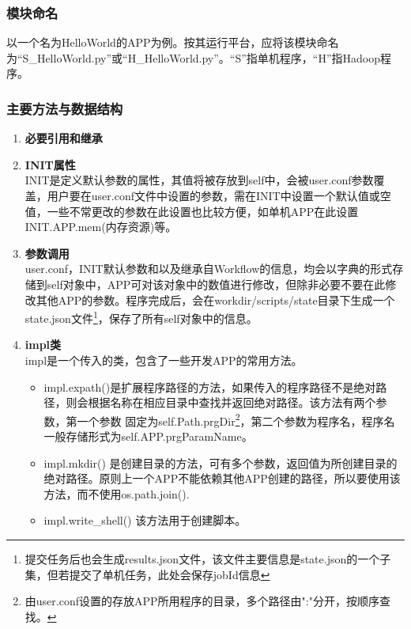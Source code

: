 \documentclass[UTF8,10pt,a4paper]{ctexart}
\begin{document}
 \subsubsection{模块命名}
以一个名为HelloWorld的APP为例。按其运行平台，应将该模块命名为``S\_HelloWorld.py''或``H\_HelloWorld.py''。``S''指单机程序，``H''指Hadoop程序。
\subsubsection{主要方法与数据结构}

\newpage
\begin{enumerate}
\item \textbf{必要引用和继承}\\

\item \textbf{INIT属性}\\
INIT是定义默认参数的属性，其值将被存放到self中，会被user.conf参数覆盖，用户要在user.conf文件中设置的参数，需在INIT中设置一个默认值或空值，一些不常更改的参数在此设置也比较方便，如单机APP在此设置INIT.APP.mem(内存资源)等。

\item \textbf{参数调用}\\
user.conf，INIT默认参数和以及继承自Workflow的信息，均会以字典的形式存储到self对象中，APP可对该对象中的数值进行修改，但除非必要不要在此修改其他APP的参数。程序完成后，会在workdir/scripts/state目录下生成一个state.json文件\footnote{提交任务后也会生成results.json文件，该文件主要信息是state.json的一个子集，但若提交了单机任务，此处会保存jobId信息}，保存了所有self对象中的信息。

\item \textbf{impl类}\\
impl是一个传入的类，包含了一些开发APP的常用方法。
\begin{itemize}
\item impl.expath()是扩展程序路径的方法，如果传入的程序路径不是绝对路径，则会根据名称在相应目录中查找并返回绝对路径。该方法有两个参数，第一个参数 固定为self.Path.prgDir\footnote{由user.conf设置的存放APP所用程序的目录，多个路径由":"分开，按顺序查找。}，第二个参数为程序名，程序名一般存储形式为self.APP.prgParamName。
\item impl.mkdir() 是创建目录的方法，可有多个参数，返回值为所创建目录的绝对路径。原则上一个APP不能依赖其他APP创建的路径，所以要使用该方法，而不使用os.path.join().
\item impl.write\_shell()  该方法用于创建脚本。
\end{itemize}

\end{enumerate}
\end{document}
